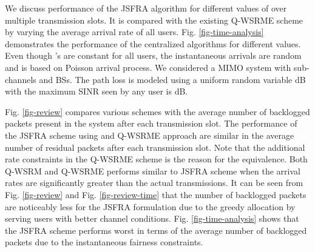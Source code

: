 
We discuss performance of the \ac{JSFRA} algorithm for different values of  over multiple transmission slots. It is compared with the existing \ac{Q-WSRME} scheme by varying the average arrival rate  of all users. Fig. \ref{fig-time-analysis} demonstrates the performance of the centralized algorithms for different  values. Even though 's are constant for all users, the instantaneous arrivals are random and is based on Poisson arrival process. We considered a  \ac{MIMO} system with  sub-channels and  \acp{BS}. The path loss is modeled using a uniform random variable \me{[0,-3]} dB with the maximum \ac{SINR} seen by any user is  dB.

Fig. \ref{fig-review} compares various schemes with the average number of backlogged packets present in the system after each transmission slot. The performance of the \ac{JSFRA} scheme using  and \ac{Q-WSRME} approach are similar in the average number of residual packets after each transmission slot. Note that the additional rate constraints in the \ac{Q-WSRME} scheme is the reason for the equivalence. Both \ac{Q-WSRM} and \ac{Q-WSRME} performs similar to  \ac{JSFRA} scheme when the arrival rates are significantly greater than the actual transmissions. It can be seen from Fig. \ref{fig-review} and Fig. \ref{fig-review-time} that the number of backlogged packets are noticeably less for the  \ac{JSFRA} formulation due to the greedy allocation by serving users with better channel conditions. Fig. \ref{fig-time-analysis} shows that the \me{\ell_{\infty}} \ac{JSFRA} scheme performs worst in terms of the average number of backlogged packets due to the instantaneous fairness constraints.
